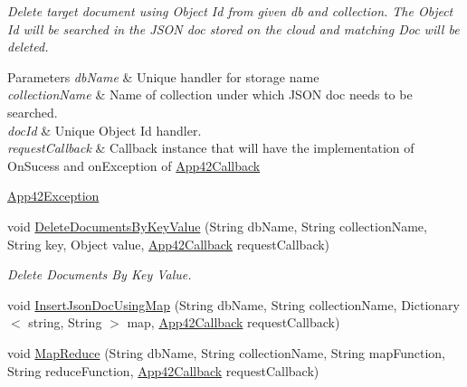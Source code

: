 \begin{DoxyCompactItemize}
\begin{DoxyCompactList}\small\item\em Delete target document using Object Id from given db and collection. The Object Id will be searched in the J\+S\+O\+N doc stored on the cloud and matching Doc will be deleted. 
\begin{DoxyParams}{Parameters}
{\em db\+Name} & Unique handler for storage name\\
\hline
{\em collection\+Name} & Name of collection under which J\+S\+O\+N doc needs to be searched.\\
\hline
{\em doc\+Id} & Unique Object Id handler.\\
\hline
{\em request\+Callback} & Callback instance that will have the implementation of On\+Sucess and on\+Exception of \hyperlink{interfacecom_1_1shephertz_1_1app42_1_1paas_1_1sdk_1_1windows_1_1_app42_callback}{App42\+Callback}\\
\hline
\end{DoxyParams}
\hyperlink{classcom_1_1shephertz_1_1app42_1_1paas_1_1sdk_1_1windows_1_1_app42_exception}{App42\+Exception}\end{DoxyCompactList}\item 
void \hyperlink{classcom_1_1shephertz_1_1app42_1_1paas_1_1sdk_1_1windows_1_1storage_1_1_storage_service_a5e203dfa76856b619bdc50b2adf5ac70}{Delete\+Documents\+By\+Key\+Value} (String db\+Name, String collection\+Name, String key, Object value, \hyperlink{interfacecom_1_1shephertz_1_1app42_1_1paas_1_1sdk_1_1windows_1_1_app42_callback}{App42\+Callback} request\+Callback)
\begin{DoxyCompactList}\small\item\em Delete Documents By Key Value. \end{DoxyCompactList}\item 
void \hyperlink{classcom_1_1shephertz_1_1app42_1_1paas_1_1sdk_1_1windows_1_1storage_1_1_storage_service_a9eb0a24bd4ec889c239ee92df6661751}{Insert\+Json\+Doc\+Using\+Map} (String db\+Name, String collection\+Name, Dictionary$<$ string, String $>$ map, \hyperlink{interfacecom_1_1shephertz_1_1app42_1_1paas_1_1sdk_1_1windows_1_1_app42_callback}{App42\+Callback} request\+Callback)
\item 
void \hyperlink{classcom_1_1shephertz_1_1app42_1_1paas_1_1sdk_1_1windows_1_1storage_1_1_storage_service_a130804ef06e24ca8489746be7565432e}{Map\+Reduce} (String db\+Name, String collection\+Name, String map\+Function, String reduce\+Function, \hyperlink{interfacecom_1_1shephertz_1_1app42_1_1paas_1_1sdk_1_1windows_1_1_app42_callback}{App42\+Callback} request\+Callback)

\end{DoxyCompactItemize}
